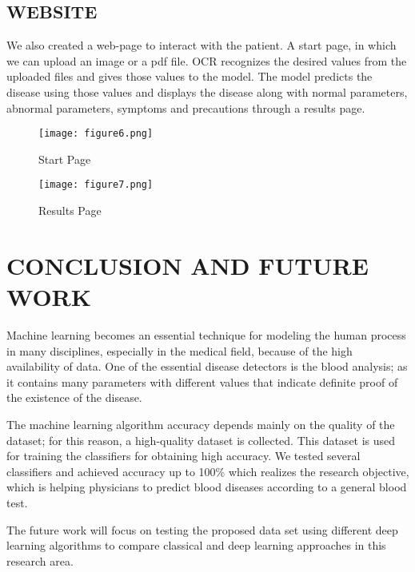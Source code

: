 \documentclass[twocolumn]{article}
\begin{document}
\begin{center}
\section{WEBSITE}
\end{center}
We also created a web-page to interact with the patient. A start page, in which we can upload an image or a pdf file. OCR recognizes the desired values from the uploaded files and gives those values to the model. The model predicts the disease using those values and displays the disease along with normal parameters, abnormal parameters, symptoms and precautions through a results page.

\vspace{0.5cm}

\begin{figure}[ht]
\centering
\texttt{[image: figure6.png]}
\label{spage}
\caption{Start Page}
\end{figure}

\vspace{0.7cm}

\begin{figure}[ht]
\centering
\texttt{[image: figure7.png]}
\label{rpage}
\caption{Results Page}
\end{figure}

\section{ CONCLUSION AND FUTURE WORK}
Machine learning becomes an essential technique for modeling the human process in many disciplines, especially in the medical field, because of the high availability of data. One of the essential disease detectors is the blood analysis; as it contains many parameters with different values that indicate definite proof of the existence of the disease.\cite{Michalski1990}

 The machine learning algorithm accuracy depends mainly on the quality of the dataset; for this reason, a high-quality dataset is collected. This dataset is used for training the classifiers for obtaining high accuracy. We tested several classifiers and achieved accuracy up to 100\% which realizes the research objective, which is helping physicians to predict blood diseases according to a general blood test.\cite{Park2016} 
 
The future work will focus on testing the proposed data set using different deep learning algorithms to compare classical and deep learning approaches in this research area.\cite{Suykens1999}




\end{document}
